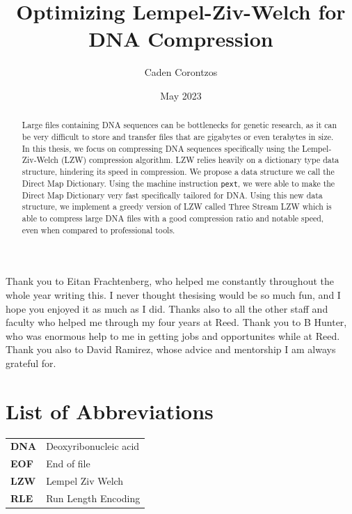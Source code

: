 \documentclass[12pt,twoside]{reedthesis}
\title{Optimizing Lempel-Ziv-Welch for DNA Compression}
\author{Caden Corontzos}
\date{May 2023}
\begin{document}
  \maketitle

\frontmatter %
\pagestyle{empty} %
  \begin{acknowledgements}
    Thank you to Eitan Frachtenberg, who helped me constantly throughout the whole year writing this. I never thought thesising would be so much fun, and I hope you enjoyed it as much as I did.
    Thanks also to all the other staff and faculty who helped me through my four years at Reed. Thank you to B Hunter, who was enormous help to me in getting jobs and opportunites while at Reed. Thank you also to David Ramirez, whose advice and mentorship I am always grateful for.
  \end{acknowledgements}

\chapter*{List of Abbreviations}
\begin{table}[h]
    \centering
    \begin{tabular}{ll}
                \textbf{DNA} & Deoxyribonucleic acid \\
                \textbf{EOF} & End of file \\
                \textbf{LZW} & Lempel Ziv Welch \\
                \textbf{RLE} & Run Length Encoding \\
            \end{tabular}
\end{table}
  \hypersetup{linkcolor=black}
  \setcounter{secnumdepth}{2}
  \setcounter{tocdepth}{2}
  \tableofcontents

  \listoftables

  \listoffigures
  \begin{abstract}
    Large files containing DNA sequences can be bottlenecks for genetic research, as it can be very difficult to store and transfer files that are gigabytes or even terabytes in size. In this thesis, we focus on compressing DNA sequences specifically using the Lempel-Ziv-Welch (LZW) compression algorithm. LZW relies heavily on a dictionary type data structure, hindering its speed in compression. We propose a data structure we call the Direct Map Dictionary. Using the machine instruction \texttt{pext}, we were able to make the Direct Map Dictionary very fast specifically tailored for DNA. Using this new data structure, we implement a greedy version of LZW called Three Stream LZW which is able to compress large DNA files with a good compression ratio and notable speed, even when compared to professional tools.
  \end{abstract}
\end{document}
